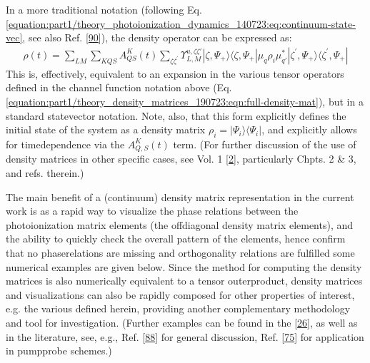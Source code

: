 \documentclass[letterpaper,table,10pt,english]{jupyterBook}
\begin{document}
\sphinxAtStartPar
In a more traditional notation (following Eq. \eqref{equation:part1/theory_photoionization_dynamics_140723:eq:continuum-state-vec}, see also Ref. {[}\hyperlink{cite.backmatter/bibliography:id626}{90}{]}), the density operator can be expressed as:
\begin{equation}\label{equation:part1/theory_density_matrices_190723:eqn:full-density-mat-traditional}
\begin{split}
\rho(t) =\sum_{LM}\sum_{KQS}A^{K}_{QS}(t)\sum_{\zeta\zeta^{\prime}}\varUpsilon_{L,M}^{u,\zeta\zeta'}|\zeta,\Psi_+\rangle\langle\zeta,\Psi_+|\mu_q\rho_i\mu_{q\prime}^{*}|\zeta^{\prime},\Psi_+\rangle\langle\zeta^{\prime},\Psi_+|
\end{split}
\end{equation}
\sphinxAtStartPar
This is, effectively, equivalent to an expansion in the various tensor operators defined in the channel function notation above (Eq. \eqref{equation:part1/theory_density_matrices_190723:eqn:full-density-mat}), but in a standard state\sphinxhyphen{}vector notation. Note, also, that this form explicitly defines the initial state of the system as a density matrix \(\rho_i = |\Psi_i\rangle\langle\Psi_i|\), and explicitly allows for time\sphinxhyphen{}dependence via the \(A_{Q,S}^{K}(t)\) term. (For further discussion of the use of density matrices in other specific cases, see  Vol. 1 {[}\hyperlink{cite.backmatter/bibliography:id663}{2}{]}, particularly Chpts. 2 \& 3, and refs. therein.)

\sphinxAtStartPar
The main benefit of a (continuum) density matrix representation in the current work is as a rapid way to visualize the phase relations between the photoionization matrix elements (the off\sphinxhyphen{}diagonal density matrix elements), and the ability to quickly check the overall pattern of the elements, hence confirm that no phase\sphinxhyphen{}relations are missing and orthogonality relations are fulfilled \sphinxhyphen{} some numerical examples are given below. Since the method for computing the density matrices is also numerically equivalent to a tensor outer\sphinxhyphen{}product, density matrices and visualizations can also be rapidly composed for other properties of interest, e.g. the various {\hyperref[\detokenize{backmatter/glossary:term-channel-functions}]{}} defined herein, providing another complementary methodology and tool for investigation. (Further examples can be found in the  {[}\hyperlink{cite.backmatter/bibliography:id595}{26}{]}, as well as in the literature, see, e.g., Ref. {[}\hyperlink{cite.backmatter/bibliography:id525}{88}{]} for general discussion, Ref. {[}\hyperlink{cite.backmatter/bibliography:id817}{75}{]} for application in pump\sphinxhyphen{}probe schemes.)
\end{document}
